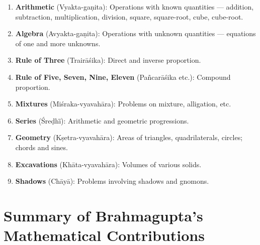 \documentclass[11pt,a4paper]{article}
\begin{document}
\begin{enumerate}
\item \textbf{Arithmetic} (Vyakta-gaṇita): Operations with known quantities --- addition, subtraction, multiplication, division, square, square-root, cube, cube-root.
\item \textbf{Algebra} (Avyakta-gaṇita): Operations with unknown quantities --- equations of one and more unknowns.
\item \textbf{Rule of Three} (Trair\=a\'sika): Direct and inverse proportion.
\item \textbf{Rule of Five, Seven, Nine, Eleven} (Pañcar\=a\'sika etc.): Compound proportion.
\item \textbf{Mixtures} (Mi\'sraka-vyavah\=ara): Problems on mixture, alligation, etc.
\item \textbf{Series} (\'Sreḍh\=ī): Arithmetic and geometric progressions.
\item \textbf{Geometry} (Kṣetra-vyavah\=ara): Areas of triangles, quadrilaterals, circles; chords and sines.
\item \textbf{Excavations} (Kh\=ata-vyavah\=ara): Volumes of various solids.
\item \textbf{Shadows} (Ch\=ay\=a): Problems involving shadows and gnomons.
\end{enumerate}

\clearpage

\section*{Summary of Brahmagupta's Mathematical Contributions}
\end{document}
